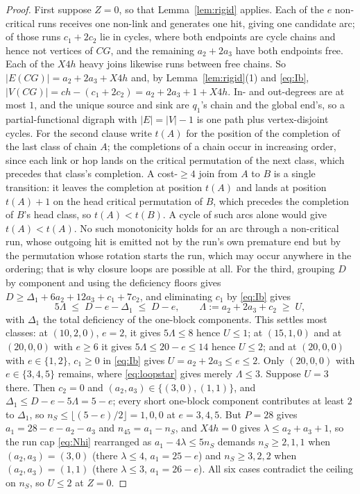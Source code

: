 \documentclass[10pt]{article}
\theoremstyle{remark}
\theoremstyle{plain}
\newcommand{\NCh}{\mathit{ch}}
\begin{document}
\begin{proof}
First suppose $Z=0$, so that Lemma~\ref{lem:rigid} applies.  Each of
the $e$ non-critical runs receives one non-link and generates one hit, giving one candidate arc; of those runs $c_1+2c_2$ lie in
cycles, where both endpoints are cycle chains and hence not vertices of
$CG$, and the remaining $a_2+2a_3$ have both endpoints free.  Each of
the $X4h$ heavy joins likewise runs between free chains.  So
$|E(CG)|=a_2+2a_3+X4h$ and, by Lemma~\ref{lem:rigid}(1) and
\eqref{eq:Ib}, $|V(CG)|=\NCh-(c_1+2c_2)=a_2+2a_3+1+X4h$.  In- and
out-degrees are at most $1$, and the unique source and sink are $q_1$'s
chain and the global end's, so a partial-functional digraph with
$|E|=|V|-1$ is one path plus vertex-disjoint cycles.  For the second
clause write $t(A)$ for the position of the completion of the last
class of chain $A$; the completions of a chain occur in increasing
order, since each link or hop lands on the critical permutation of the
next class, which precedes that class's completion.  A cost-$\ge4$
join from $A$ to $B$ is a single transition: it leaves the completion
at position $t(A)$ and lands at position $t(A)+1$ on the head critical
permutation of $B$, which precedes the completion of $B$'s head class,
so $t(A)<t(B)$.  A cycle of such arcs alone would give $t(A)<t(A)$.
No such monotonicity holds for an arc through a non-critical run, whose
outgoing hit is emitted not by the run's own premature end but by the
permutation whose rotation starts the run, which may occur anywhere in
the ordering; that is why closure loops are possible at all.  For the third,
grouping $D$ by component and using the deficiency floors gives
$D\ge \Delta_1+6a_2+12a_3+c_1+7c_2$, and eliminating $c_1$ by
\eqref{eq:Ib} gives
\begin{equation}\label{eq:loopstar}
5\Lambda\;\le\;D-e-\Delta_1\;\le\;D-e,
\qquad \Lambda:=a_2+2a_3+c_2\;\ge\;U,
\end{equation}
with $\Delta_1$ the total deficiency of the one-block components.  This
settles most classes: at $(10,2,0)$, $e=2$, it gives $5\Lambda\le 8$
hence $U\le 1$; at $(15,1,0)$ and at $(20,0,0)$ with $e\ge 6$ it gives
$5\Lambda\le 20-e\le 14$ hence $U\le 2$; and at $(20,0,0)$ with
$e\in\{1,2\}$, $c_1\ge 0$ in \eqref{eq:Ib} gives $U=a_2+2a_3\le e\le
2$.  Only $(20,0,0)$ with $e\in\{3,4,5\}$ remains, where
\eqref{eq:loopstar} gives merely $\Lambda\le 3$.  Suppose $U=3$ there.
Then $c_2=0$ and $(a_2,a_3)\in\{(3,0),(1,1)\}$, and
$\Delta_1\le D-e-5\Lambda=5-e$; every short one-block component
contributes at least $2$ to $\Delta_1$, so
$n_S\le\lfloor(5-e)/2\rfloor=1,0,0$ at $e=3,4,5$.  But $P=28$ gives
$a_1=28-e-a_2-a_3$ and $n_{45}=a_1-n_S$, and $X4h=0$ gives
$\lambda\le a_2+a_3+1$, so the run cap \eqref{eq:Nhi} rearranged as
$a_1-4\lambda\le 5n_S$ demands $n_S\ge 2,1,1$ when $(a_2,a_3)=(3,0)$
(there $\lambda\le 4$, $a_1=25-e$) and $n_S\ge 3,2,2$ when
$(a_2,a_3)=(1,1)$ (there $\lambda\le 3$, $a_1=26-e$).  All six cases
contradict the ceiling on $n_S$, so $U\le 2$ at $Z=0$.


\end{proof}
\end{document}

